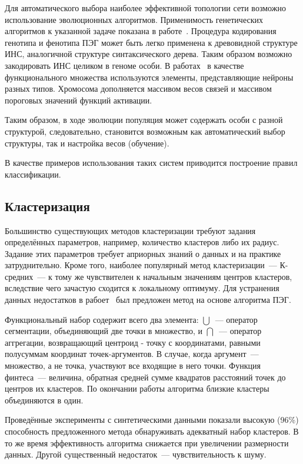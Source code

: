 Для автоматического выбора наиболее эффективной топологии сети возможно использование эволюционных алгоритмов. Применимость генетических алгоритмов к указанной задаче показана в работе~\cite{stanley1996efficient}. Процедура кодирования генотипа и фенотипа ПЭГ может быть легко применена к древовидной структуре ИНС, аналогичной структуре синтаксического дерева. Таким образом возможно закодировать ИНС целиком в геноме особи. В работах~\cite{ferreira:2004:wsc9, Ferreira:wsc9, li2005new, conf/gecco/JohnsS09} в качестве функционального множества используются элементы, представляющие нейроны разных типов. Хромосома дополняется массивом весов связей и массивом пороговых значений функций активации.

Таким образом, в ходе эволюции популяция может содержать особи с разной структурой, следовательно, становится возможным как автоматический выбор структуры, так и настройка весов (обучение).

В качестве примеров использования таких систем приводится построение правил классификации.


\subsection{Кластеризация}

Большинство существующих методов кластеризации требуют задания определённых параметров, например, количество кластеров либо их радиус. Задание этих параметров требует априорных знаний о данных и на практике затруднительно. Кроме того, наиболее популярный метод кластеризации~--- К-средних~--- к тому же чувствителен к начальным значениям центров кластеров, вследствие чего зачастую сходится к локальному оптимуму. Для устранения данных недостатков в рабоет~\cite{Chen:2007:CWP:1304603.1305730} был предложен метод на основе алгоритма ПЭГ.

Функциональный набор содержит всего два элемента: $\bigcup$~--- оператор сегментации, объединяющий две точки в множество, и $\bigcap$~--- оператор аггрегации, возвращающий центроид - точку с координатами, равными полусуммам координат точек-аргументов. В случае, когда аргумент~--- множество, а не точка, участвуют все входящие в него точки. Функция финтеса~--- величина, обратная средней сумме квадратов расстояний точек до центров их кластеров. По окончании работы алгоритма близкие кластеры объединяются в один.

Проведённые эксперименты с синтетическими данными показали высокую (96\%) способность предложенного метода обнаруживать адекватный набор кластеров. В то же время эффективность алгоритма снижается при увеличении размерности данных. Другой существенный недостаток~--- чувствительность к шуму.



